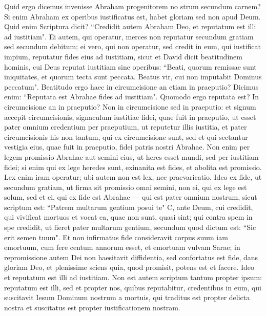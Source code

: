 \begin{biblechapter}  
\verse Quid ergo dicemus invenisse Abraham progenitorem no strum secundum carnem? 
\verse Si enim Abraham ex operibus iustificatus est, habet gloriam sed non apud Deum. 
\verse Quid enim Scriptura dicit? “Credidit autem Abraham Deo, et reputatum est illi ad iustitiam". 
\verse Ei autem, qui operatur, merces non reputatur secundum gratiam sed secundum debitum; 
\verse ei vero, qui non operatur, sed credit in eum, qui iustificat impium, reputatur fides eius ad iustitiam, 
\verse sicut et David dicit beatitudinem hominis, cui Deus reputat iustitiam sine operibus: 
\verse “Beati, quorum remissae sunt iniquitates, et quorum tecta sunt peccata. 
\verse Beatus vir, cui non imputabit Dominus peccatum". 
\verse Beatitudo ergo haec in circumcisione an etiam in praeputio? Dicimus enim: “Reputata est Abrahae fides ad iustitiam". 
\verse Quomodo ergo reputata est? In circumcisione an in praeputio? Non in circumcisione sed in praeputio: 
\verse et signum accepit circumcisionis, signaculum iustitiae fidei, quae fuit in praeputio, ut esset pater omnium credentium per praeputium, ut reputetur illis iustitia, 
\verse et pater circumcisionis his non tantum, qui ex circumcisione sunt, sed et qui sectantur vestigia eius, quae fuit in praeputio, fidei patris nostri Abrahae. 
\verse Non enim per legem promissio Abrahae aut semini eius, ut heres esset mundi, sed per iustitiam fidei; 
\verse si enim qui ex lege heredes sunt, exinanita est fides, et abolita est promissio. 
\verse Lex enim iram operatur; ubi autem non est lex, nec praevaricatio. 
\verse Ideo ex fide, ut secundum gratiam, ut firma sit promissio omni semini, non ei, qui ex lege est solum, sed et ei, qui ex fide est Abrahae — qui est pater omnium nostrum, 
\verse sicut scriptum est: “Patrem multarum gentium posui te" C, ante Deum, cui credidit, qui vivificat mortuos et vocat ea, quae non sunt, quasi sint; 
\verse qui contra spem in spe credidit, ut fieret pater multarum gentium, secundum quod dictum est: “Sic erit semen tuum". 
\verse Et non infirmatus fide consideravit corpus suum iam emortuum, cum fere centum annorum esset, et emortuam vulvam Sarae; 
\verse in repromissione autem Dei non haesitavit diffidentia, sed confortatus est fide, dans gloriam Deo,  
\verse et plenissime sciens quia, quod promisit, potens est et facere. 
\verse Ideo et reputatum est illi ad iustitiam. 
\verse Non est autem scriptum tantum propter ipsum: reputatum est illi, 
\verse sed et propter nos, quibus reputabitur, credentibus in eum, qui suscitavit Iesum Dominum nostrum a mortuis, 
\verse qui traditus est propter delicta nostra et suscitatus est propter iustificationem nostram. 
\end{biblechapter}

